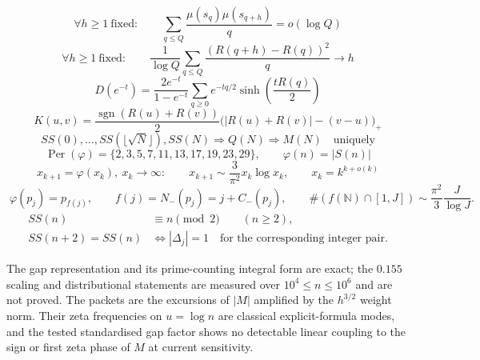 \documentclass[11pt]{amsart}
\numberwithin{equation}{section}
\theoremstyle{plain}
\theoremstyle{definition}
\theoremstyle{remark}
\begin{document}
\begin{equation}
\label{eq:summary-sf-chowla}
\boxed{\;\forall h\ge1\ \text{fixed}:\qquad
\sum_{q\le Q}\frac{\mu(s_q)\mu(s_{q+h})}{q}=o(\log Q)\;}
\end{equation}
\begin{equation}
\label{eq:summary-window-variance}
\boxed{\;\forall h\ge1\ \text{fixed}:\qquad
\frac1{\log Q}\sum_{q\le Q}
\frac{(R(q+h)-R(q))^2}{q}\to h\;}
\end{equation}
\begin{equation}
\label{eq:summary-D-sinh}
\boxed{\;D(e^{-t})=
\frac{2e^{-t}}{1-e^{-t}}\sum_{q\ge0}e^{-tq/2}
\sinh\!\left(\frac{tR(q)}2\right)\;}
\end{equation}
\begin{equation}
\label{eq:summary-survival-kernel}
\boxed{\;K(u,v)=\frac{\operatorname{sgn}(R(u)+R(v))}{2}
\bigl(|R(u)+R(v)|-(v-u)\bigr)_+\;}
\end{equation}
\begin{equation}
\label{eq:summary-sqrt-recovery}
\boxed{\;SS(0),\ldots,SS(\lfloor\sqrt N\rfloor),SS(N)
\Longrightarrow Q(N)\Longrightarrow M(N)\quad\text{uniquely}\;}
\end{equation}
\begin{equation}
\label{eq:summary-phi-dynamics}
\boxed{\;\operatorname{Per}(\varphi)=\{2,3,5,7,11,13,17,19,23,29\},
\qquad \varphi(n)=|S(n)|\;}
\end{equation}
\begin{equation}
\label{eq:summary-phi-escape}
\boxed{\;x_{k+1}=\varphi(x_k),\ x_k\to\infty:
\qquad x_{k+1}\sim\frac{3}{\pi^2}x_k\log x_k,
\qquad x_k=k^{k+o(k)}\;}
\end{equation}
\begin{equation}
\label{eq:summary-prime-index-dynamics}
\boxed{\;\varphi(p_j)=p_{f(j)},\qquad
f(j)=N_-(p_j)=j+C_-(p_j),\qquad
\#(f(\mathbb N)\cap[1,J])\sim\frac{\pi^2}{3}\frac{J}{\log J}.\;}
\end{equation}
\begin{equation}
\label{eq:summary-parity-collision}
\boxed{\begin{aligned}
SS(n)&\equiv n\pmod2\qquad(n\ge2),\\
SS(n+2)=SS(n)&\iff |\Delta_j|=1
\quad\text{for the corresponding integer pair}.
\end{aligned}}
\end{equation}

The gap representation and its prime-counting integral form are exact; the
$0.155$ scaling and distributional statements are measured over
$10^{4}\le n\le10^{6}$ and are not proved. The packets are the excursions of
$|M|$ amplified by the $h^{3/2}$ weight norm. Their zeta frequencies on
$u=\log n$ are classical explicit-formula modes, and the tested standardised
gap factor shows no detectable linear coupling to the sign or first zeta phase
of $M$ at current sensitivity.
\end{document}
